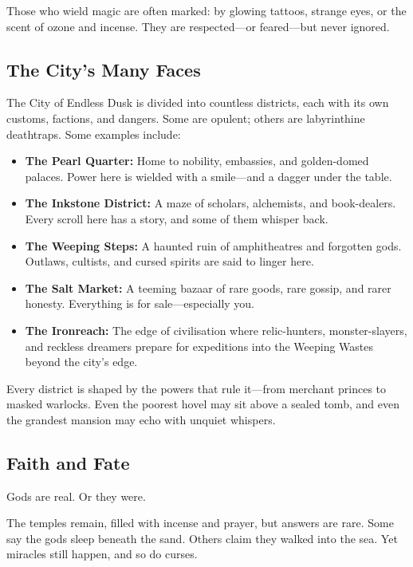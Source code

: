 Those who wield magic are often marked: by glowing tattoos, strange eyes, or the scent of ozone and incense. They are respected—or feared—but never ignored.

\subsection{The City’s Many Faces}

The City of Endless Dusk is divided into countless districts, each with its own customs, factions, and dangers. Some are opulent; others are labyrinthine deathtraps. Some examples include:

\begin{itemize}\raggedright
    \item \textbf{The Pearl Quarter:} Home to nobility, embassies, and golden-domed palaces. Power here is wielded with a smile—and a dagger under the table.
    \item \textbf{The Inkstone District:} A maze of scholars, alchemists, and book-dealers. Every scroll here has a story, and some of them whisper back.
    \item \textbf{The Weeping Steps:} A haunted ruin of amphitheatres and forgotten gods. Outlaws, cultists, and cursed spirits are said to linger here.
    \item \textbf{The Salt Market:} A teeming bazaar of rare goods, rare gossip, and rarer honesty. Everything is for sale—especially you.
    \item \textbf{The Ironreach:} The edge of civilisation where relic-hunters, monster-slayers, and reckless dreamers prepare for expeditions into the Weeping Wastes beyond the city's edge.
\end{itemize}

Every district is shaped by the powers that rule it—from merchant princes to masked warlocks. Even the poorest hovel may sit above a sealed tomb, and even the grandest mansion may echo with unquiet whispers.

\subsection{Faith and Fate}

Gods are real. Or they were.

The temples remain, filled with incense and prayer, but answers are rare. Some say the gods sleep beneath the sand. Others claim they walked into the sea. Yet miracles still happen, and so do curses.

